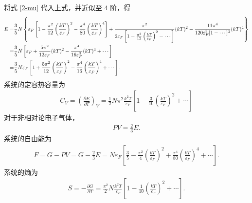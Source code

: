\documentclass{assignment}
\begin{document}
\begin{pf}
    将式 \eqref{2-mu} 代入上式，并近似至 $4$ 阶，得
    \begin{align}
        \notag E=&\frac{3}{5}N\left\{\varepsilon_F\left[1-\frac{\pi^2}{12}\left(\frac{kT}{\varepsilon_F}\right)^2-\frac{\pi^4}{80}\left(\frac{kT}{\varepsilon_F}\right)^4\right]+\frac{\pi^2}{2\varepsilon_F\left[1-\frac{\pi^2}{12}\left(\frac{kT}{\varepsilon_F}\right)^2-\cdots\right]}(kT)^2-\frac{11\pi^4}{120\varepsilon_F^3[1-\cdots]^3}(kT)^4\right\}\\
        \notag=&\frac{3}{5}N\left[\varepsilon_F+\frac{5\pi^2}{12\varepsilon_F}(kT)^2-\frac{\pi^4}{16\varepsilon_F^3}(kT)^4+\cdots\right]\\
        =&\frac{3}{5}N\varepsilon_F\left[1+\frac{5\pi^2}{12}\left(\frac{kT}{\varepsilon_F}\right)^2-\frac{\pi^4}{16}\left(\frac{kT}{\varepsilon_F}\right)^4+\cdots\right].
    \end{align}
    系统的定容热容量为
    \begin{align}
        C_V=\left(\frac{\partial E}{\partial T}\right)_V=\frac{1}{2}N\pi^2\frac{k^2T}{\varepsilon_F}\left[1-\frac{3}{10}\left(\frac{kT}{\varepsilon_F}\right)^2+\cdots\right]
    \end{align}
    对于非相对论电子气体，
    \begin{align}
        PV=\frac{2}{3}E.
    \end{align}
    系统的自由能为
    \begin{align}
        F=G-PV=G-\frac{2}{3}E=N\varepsilon_F\left[\frac{3}{5}-\frac{\pi^2}{4}\left(\frac{kT}{\varepsilon_F}\right)^2+\frac{\pi^4}{80}\left(\frac{kT}{\varepsilon_F}\right)^4+\cdots\right].
    \end{align}
    系统的熵为
    \begin{align}
        S=-\frac{\partial G}{\partial T}=\frac{\pi^2}{2}N\frac{k^2T}{\varepsilon_F}\left[1-\frac{1}{10}\left(\frac{kT}{\varepsilon_F}\right)^2+\cdots\right].
    \end{align}
\end{pf}
\end{document}
